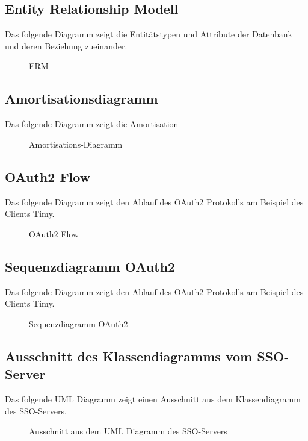\subsection{Entity Relationship Modell}
\label{app:ERM}
Das folgende Diagramm zeigt die Entitätstypen und Attribute der Datenbank und deren Beziehung zueinander.
\begin{figure}[htb]
\centering
{}
\caption{ERM}
\end{figure}
\clearpage

\subsection{Amortisationsdiagramm}
\label{app:Amortisationsdiagramm}
Das folgende Diagramm zeigt die Amortisation
\begin{figure}[htb]
\centering
{}
\caption{Amortisations-Diagramm}
\end{figure}
\clearpage

\subsection{OAuth2 Flow}
\label{app:oauth2flow}
Das folgende Diagramm zeigt den Ablauf des OAuth2 Protokolls am Beispiel des Clients Timy.
\begin{figure}[htb]
\centering
{}
\caption{OAuth2 Flow}
\end{figure}
\clearpage

\subsection{Sequenzdiagramm OAuth2}
\label{app:sequenzdiagramm}
Das folgende Diagramm zeigt den Ablauf des OAuth2 Protokolls am Beispiel des Clients Timy.
\begin{figure}[htb]
\centering
{}
\caption{Sequenzdiagramm OAuth2}
\end{figure}
\clearpage



\subsection{Ausschnitt des Klassendiagramms vom SSO-Server}
\label{app:passport-controllers}
Das folgende UML Diagramm zeigt einen Ausschnitt aus dem Klassendiagramm des \ac{SSO}-Servers.
\begin{figure}[htb]
\centering
{}
\caption{Ausschnitt aus dem UML Diagramm des SSO-Servers}
\end{figure}
\clearpage

